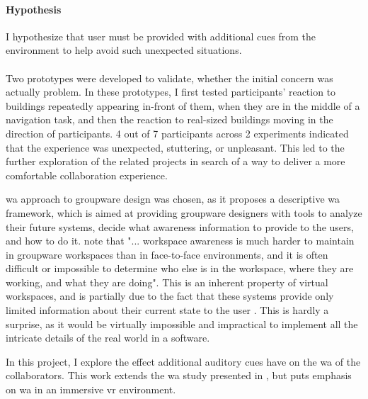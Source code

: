 \paragraph{Hypothesis} I hypothesize that user must be provided with additional cues from the environment to help avoid such unexpected situations. 
 
\paragraph{}
Two prototypes were developed to validate, whether the initial concern was actually problem. In these prototypes, I first tested participants' reaction to buildings repeatedly appearing in-front of them, when they are in the middle of a navigation task, and then the reaction to real-sized buildings moving in the direction of participants. 4 out of 7 participants across 2 experiments indicated that the experience was unexpected, stuttering, or unpleasant. This led to the further exploration of the related projects in search of a way to deliver a more comfortable collaboration experience.

\gls{wa} approach to groupware design was chosen, as it proposes a descriptive \gls{wa} framework, which is aimed at providing groupware designers with tools to analyze their future systems, decide what awareness information to provide to the users, and how to do it. \cite{gutwin_descriptive_2002} note that "... workspace awareness is much harder to maintain in groupware workspaces than in face-to-face environments, and it is often difficult or impossible to determine who else is in the workspace, where they are working, and what they are doing". This is an inherent property of virtual workspaces, and is partially due to the fact that these systems provide only limited information about their current state to the user \cite[p.~414-415]{gutwin_descriptive_2002}. This is hardly a surprise, as it would be virtually impossible and impractical to implement all the intricate details of the real world in a software. 

In this project, I explore the effect additional auditory cues have on the \gls{wa} of the collaborators. This work extends the \gls{wa} study presented in \cite{gutwin_chalk_2011}, but puts emphasis on \gls{wa} in an immersive \gls{vr} environment.

